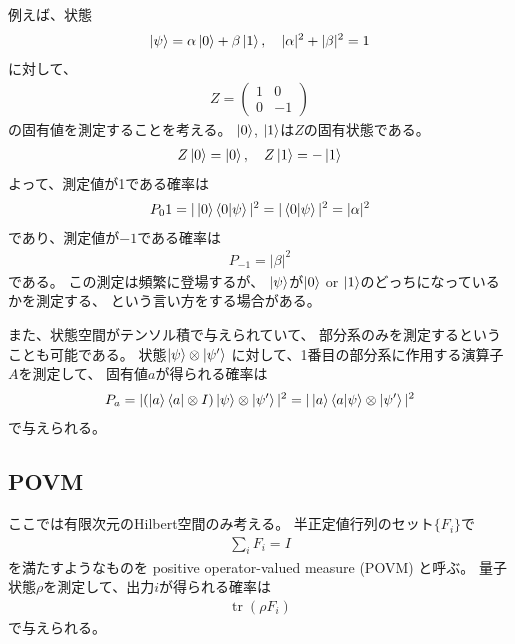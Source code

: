 \documentclass[]{ltjsarticle}
\DeclareMathOperator{\tr}{tr}
\begin{document}
例えば、状態
\begin{align}
    \ket{\psi} 
    =
    \alpha\ket{0}   
    +
    \beta\ket{1}, \quad 
    |\alpha|^2 + |\beta|^2 = 1
\end{align}
に対して、
\begin{align}
    Z =
    \begin{pmatrix}
        1 & 0 \\
        0 & -1
    \end{pmatrix}
\end{align}
の固有値を測定することを考える。
$\ket{0}$, $\ket{1}$は$Z$の固有状態である。
\begin{align}
    Z \ket{0} = \ket{0}, \quad 
    Z \ket{1} = -\ket{1} 
\end{align}
よって、測定値が1である確率は
\begin{align}
    P_01
    = 
    |\ket{0}\braket{0|\psi}|^2
    =
    |\braket{0|\psi}|^2
    =
    |\alpha|^2
\end{align}
であり、測定値が$-1$である確率は
\begin{align}
    P_{-1} = |\beta|^2
\end{align}
である。
この測定は頻繁に登場するが、
$\ket{\psi}$が$\ket{0}$ or $\ket{1}$のどっちになっているかを測定する、
という言い方をする場合がある。

また、状態空間がテンソル積で与えられていて、
部分系のみを測定するということも可能である。
状態$\ket{\psi}\otimes\ket{\psi'}$
に対して、1番目の部分系に作用する演算子$A$を測定して、
固有値$a$が得られる確率は
\begin{align}
    P_a 
    = |(\ket{a}\bra{a} \otimes I) \ket{\psi}\otimes\ket{\psi'}|^2
    = |\ket{a}\braket{a|\psi}\otimes\ket{\psi'}|^2
\end{align}
で与えられる。



\subsection{POVM}
ここでは有限次元のHilbert空間のみ考える。
半正定値行列のセット$\{F_i\}$で
\begin{align}
    \sum_i F_i = I
\end{align}
を満たすようなものを
positive operator-valued measure (POVM)
と呼ぶ。
量子状態$\rho$を測定して、出力$i$が得られる確率は
\begin{align}
    \tr(\rho F_i)    
\end{align}
で与えられる。
\end{document}

